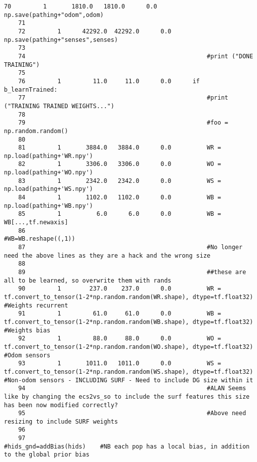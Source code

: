 \begin{lstlisting}[xrightmargin=0.05\linewidth,caption=Line by line profiling of the learnWeights\#learn function (boltzmann probs as an eager function), label=profiling:line_learn]
    70         1       1810.0   1810.0      0.0          np.save(pathing+"odom",odom)
    71                                           
    72         1      42292.0  42292.0      0.0          np.save(pathing+"senses",senses)
    73                                                
    74                                                   #print ("DONE TRAINING")
    75                                           
    76         1         11.0     11.0      0.0      if b_learnTrained:
    77                                                   #print ("TRAINING TRAINED WEIGHTS...")
    78                                           
    79                                                   #foo = np.random.random()
    80                                           
    81         1       3884.0   3884.0      0.0          WR = np.load(pathing+'WR.npy')
    82         1       3306.0   3306.0      0.0          WO = np.load(pathing+'WO.npy')
    83         1       2342.0   2342.0      0.0          WS = np.load(pathing+'WS.npy')
    84         1       1102.0   1102.0      0.0          WB = np.load(pathing+'WB.npy')
    85         1          6.0      6.0      0.0          WB = WB[...,tf.newaxis]
    86                                                   #WB=WB.reshape((,1))
    87                                                   #No longer need the above lines as they are a hack and the wrong size
    88                                           
    89                                                   ##these are all to be learned, so overwrite them with rands
    90         1        237.0    237.0      0.0          WR = tf.convert_to_tensor(1-2*np.random.random(WR.shape), dtype=tf.float32) #Weights recurrent
    91         1         61.0     61.0      0.0          WB = tf.convert_to_tensor(1-2*np.random.random(WB.shape), dtype=tf.float32) #Weights bias
    92         1         88.0     88.0      0.0          WO = tf.convert_to_tensor(1-2*np.random.random(WO.shape), dtype=tf.float32) #Odom sensors
    93         1       1011.0   1011.0      0.0          WS = tf.convert_to_tensor(1-2*np.random.random(WS.shape), dtype=tf.float32) #Non-odom sensors - INCLUDING SURF - Need to include DG size within it
    94                                                   #ALAN Seems like by changing the ecs2vs_so to include the surf features this size has been now modified correctly?
    95                                                   #Above need resizing to include SURF weights
    96                                           
    97                                                   #hids_gnd=addBias(hids)    #NB each pop has a local bias, in addition to the global prior bias

\end{lstlisting}
